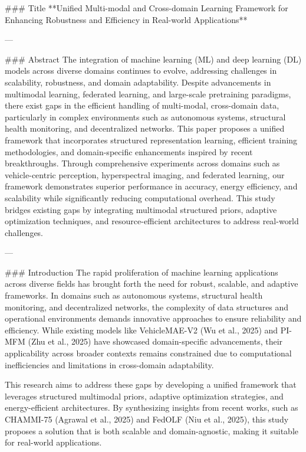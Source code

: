### Title  
**Unified Multi-modal and Cross-domain Learning Framework for Enhancing Robustness and Efficiency in Real-world Applications**

---

### Abstract  
The integration of machine learning (ML) and deep learning (DL) models across diverse domains continues to evolve, addressing challenges in scalability, robustness, and domain adaptability. Despite advancements in multimodal learning, federated learning, and large-scale pretraining paradigms, there exist gaps in the efficient handling of multi-modal, cross-domain data, particularly in complex environments such as autonomous systems, structural health monitoring, and decentralized networks. This paper proposes a unified framework that incorporates structured representation learning, efficient training methodologies, and domain-specific enhancements inspired by recent breakthroughs. Through comprehensive experiments across domains such as vehicle-centric perception, hyperspectral imaging, and federated learning, our framework demonstrates superior performance in accuracy, energy efficiency, and scalability while significantly reducing computational overhead. This study bridges existing gaps by integrating multimodal structured priors, adaptive optimization techniques, and resource-efficient architectures to address real-world challenges.

---

### Introduction  
The rapid proliferation of machine learning applications across diverse fields has brought forth the need for robust, scalable, and adaptive frameworks. In domains such as autonomous systems, structural health monitoring, and decentralized networks, the complexity of data structures and operational environments demands innovative approaches to ensure reliability and efficiency. While existing models like VehicleMAE-V2 (Wu et al., 2025) and PI-MFM (Zhu et al., 2025) have showcased domain-specific advancements, their applicability across broader contexts remains constrained due to computational inefficiencies and limitations in cross-domain adaptability.

This research aims to address these gaps by developing a unified framework that leverages structured multimodal priors, adaptive optimization strategies, and energy-efficient architectures. By synthesizing insights from recent works, such as CHAMMI-75 (Agrawal et al., 2025) and FedOLF (Niu et al., 2025), this study proposes a solution that is both scalable and domain-agnostic, making it suitable for real-world applications.


